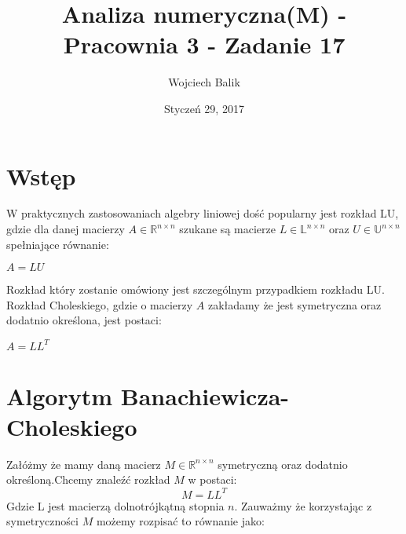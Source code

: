 \documentclass[11pt,wide]{article}
\title{Analiza numeryczna(M) - Pracownia 3 - Zadanie 17}
\date{Styczeń 29, 2017}
\author{Wojciech Balik}
\begin{document}
\maketitle                
\thispagestyle{empty}     
\tableofcontents          
\section{Wstęp}
W praktycznych zastosowaniach algebry liniowej dość popularny jest rozkład LU, gdzie dla danej macierzy $A \in \mathbb{R}^{n \times n}$ szukane są macierze $L \in \mathbb{L}^{n \times n}$ oraz $U \in \mathbb{U}^{n \times n}$ spełniające równanie:
\begin{center}
$A = LU$
\end{center}
Rozkład który zostanie omówiony jest szczególnym przypadkiem rozkładu LU. Rozkład Choleskiego, gdzie o macierzy $A$ zakładamy że jest symetryczna oraz dodatnio określona, jest postaci:
\begin{center}
$A = LL^T$
\end{center}


\section{Algorytm Banachiewicza-Choleskiego}
Załóżmy że mamy daną macierz $M \in \mathbb{R}^{n \times n}$ symetryczną oraz dodatnio określoną.Chcemy znaleźć rozkład $M$ w postaci:
\begin{equation}
M = LL^T
\end{equation}
Gdzie L jest macierzą dolnotrójkątną stopnia $n$.\newline
\noindent
Zauważmy że korzystając z symetryczności $M$ możemy rozpisać to równanie jako:
\end{document}

